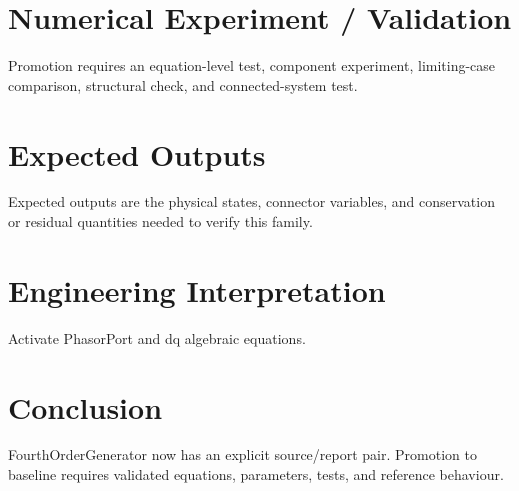 \documentclass[10pt,a4paper]{article}
\begin{document}
\section{Numerical Experiment / Validation}Promotion requires an equation-level test, component experiment, limiting-case comparison, structural check, and connected-system test.
\section{Expected Outputs}Expected outputs are the physical states, connector variables, and conservation or residual quantities needed to verify this family.
\section{Engineering Interpretation}Activate PhasorPort and dq algebraic equations.
\section*{Conclusion}FourthOrderGenerator now has an explicit source/report pair. Promotion to baseline requires validated equations, parameters, tests, and reference behaviour.
\end{document}
